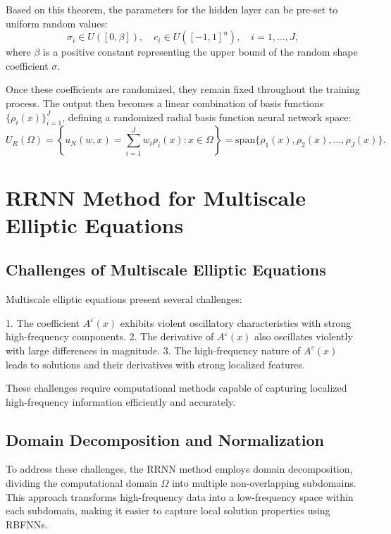 \documentclass[11pt]{article}
\begin{document}
Based on this theorem, the parameters for the hidden layer can be pre-set to uniform random values:
\begin{equation}
\sigma_i \in U([0, \beta]), \quad c_i \in U([-1, 1]^n), \quad i = 1, \ldots, J,
\end{equation}
where $\beta$ is a positive constant representing the upper bound of the random shape coefficient $\sigma$.

Once these coefficients are randomized, they remain fixed throughout the training process. The output then becomes a linear combination of basis functions $\{\rho_i(x)\}_{i=1}^J$, defining a randomized radial basis function neural network space:
\begin{equation}
U_R(\Omega) = \left\{ u_N(w, x) = \sum_{i=1}^J w_i \rho_i(x) : x \in \Omega \right\} = \text{span}\{\rho_1(x), \rho_2(x), \ldots, \rho_J(x)\}.
\end{equation}

\section{RRNN Method for Multiscale Elliptic Equations}

\subsection{Challenges of Multiscale Elliptic Equations}

Multiscale elliptic equations present several challenges:

1. The coefficient $A^{\varepsilon}(x)$ exhibits violent oscillatory characteristics with strong high-frequency components.
2. The derivative of $A^{\varepsilon}(x)$ also oscillates violently with large differences in magnitude.
3. The high-frequency nature of $A^{\varepsilon}(x)$ leads to solutions and their derivatives with strong localized features.

These challenges require computational methods capable of capturing localized high-frequency information efficiently and accurately.

\subsection{Domain Decomposition and Normalization}

To address these challenges, the RRNN method employs domain decomposition, dividing the computational domain $\Omega$ into multiple non-overlapping subdomains. This approach transforms high-frequency data into a low-frequency space within each subdomain, making it easier to capture local solution properties using RBFNNs.
\end{document}

